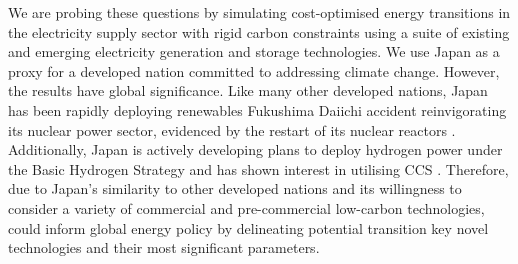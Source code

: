 We are probing these questions by simulating cost-optimised energy transitions in the electricity supply sector with rigid carbon constraints using a suite of existing and emerging electricity generation and storage technologies. We use Japan as a proxy for a developed nation committed to addressing climate change. However, the results have global significance. Like many other developed nations, Japan has been rapidly deploying renewables     Fukushima Daiichi accident    reinvigorating its nuclear power sector,  evidenced by the restart of  its nuclear reactors \cite{iaea_pris_nodate}. Additionally, Japan is actively developing plans to deploy hydrogen power under the Basic Hydrogen Strategy \cite{noauthor_basic_2017} and has shown interest in utilising \gls{CCS} \cite{meti_report_2020}. Therefore, due to Japan's similarity to other developed nations and its willingness to consider a variety of commercial and pre-commercial low-carbon technologies,    could inform global energy policy  by delineating potential transition   key novel technologies  \deleted{,} and their most significant parameters.
%

